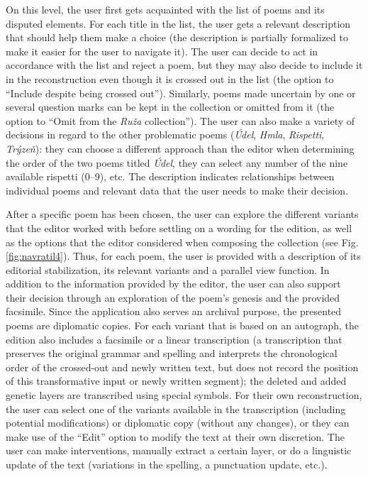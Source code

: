 \documentclass{article}
\begin{document}
On this level, the user first gets acquainted with the list of poems and
its disputed elements. For each title in the list, the user gets
a relevant description that should help them make a choice (the
description is partially formalized to make it easier for the user to
navigate it). The user can decide to act in accordance with the list and
reject a poem, but they may also decide to include it in the
reconstruction even though it is crossed out in the list (the option to
``Include despite being crossed out''). Similarly, poems made uncertain
by one or several question marks can be kept in the collection or
omitted from it (the option to ``Omit from the \emph{Ruža}
collection''). The user can also make a variety of decisions in regard
to the other problematic poems (\emph{Údel}, \emph{Hmla},
\emph{Rispetti}, \emph{Trýzeň}): they can choose a different approach
than the editor when determining the order of the two poems titled
\emph{Údel}, they can select any number of the nine available rispetti
(0--9), etc. The description indicates relationships between individual
poems and relevant data that the user needs to make their decision.

After a specific poem has been chosen, the user can explore the
different variants that the editor worked with before settling on
a wording for the edition, as well as the options that the editor
considered when composing the collection (see Fig. \ref{fig:navratil4}). Thus, for each poem, the user
is provided with a description of its editorial stabilization, its
relevant variants and a parallel view function. In addition to the
information provided by the editor, the user can also support their
decision through an exploration of the poem's genesis and the provided
facsimile. Since the application also serves an archival purpose, the
presented poems are diplomatic copies. For each variant that is based on
an autograph, the edition also includes a facsimile or a linear
transcription (a transcription that preserves the original grammar and
spelling and interprets the chronological order of the crossed-out and
newly written text, but does not record the position of this
transformative input or newly written segment); the deleted and added
genetic layers are transcribed using special symbols. For their own
reconstruction, the user can select one of the variants available in the
transcription (including potential modifications) or diplomatic copy
(without any changes), or they can make use of the ``Edit'' option to
modify the text at their own discretion. The user can make
interventions, manually extract a certain layer, or do a linguistic
update of the text (variations in the spelling, a punctuation update,
etc.).
\end{document}

